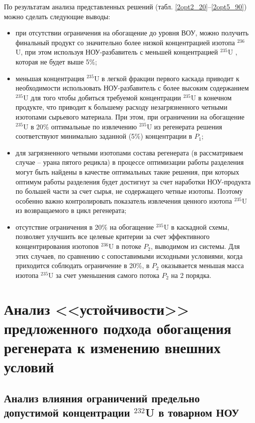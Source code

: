 По результатам анализа представленных решений (табл. \ref{2opt2_20}--\ref{2opt5_90}) можно сделать следующие выводы:
\begin{itemize}
    \item при отсутствии ограничения на обогащение до уровня ВОУ, можно получить финальный продукт со значительно более низкой концентрацией изотопа $^{236}$U, при этом используя НОУ-разбавитель с меньшей концентрацией $^{235}$U , которая не будет выше 5\%;
    \item меньшая концентрация $^{235}$U в легкой фракции первого каскада приводит к необходимости использовать НОУ-разбавитель с более высоким содержанием $^{235}$U для того чтобы добиться требуемой концентрации $^{235}$U в конечном продукте, что приводит к большему расходу незагрязненного четными изотопами сырьевого материала. При этом, при ограничении на обогащение $^{235}$U в 20\% оптимальные по извлечению $^{235}$U из регенерата решения соответствуют минимально заданной (5\%) концентрации в $P_1$;
    \item для загрязненного четными изотопами состава регенерата (в рассматриваем случае -- урана пятого рецикла) в процессе оптимизации работы разделения могут быть найдены в качестве оптимальных такие решения, при которых оптимум работы разделения будет достигнут за счет наработки НОУ-продукта по большей части за счет сырья, не содержащего четные изотопы. Поэтому особенно важно контролировать показатель извлечения ценного изотопа $^{235}$U из возвращаемого в цикл регенерата;
    \item отсутствие ограничения в 20\% на обогащение $^{235}$U в каскадной схемы, позволяет улучшить все целевые критерии за счет эффективного концентрирования изотопов $^{236}$U в потоке $P_2$, выводимом из системы. Для этих случаев, по сравнению с сопоставимыми исходными условиями, когда приходится соблюдать ограничение в 20\%, в $P_2$ оказывается меньшая масса изотопа $^{235}$U за счет уменьшения самого потока $P_2$ на 2 порядка. 
\end{itemize}


\section{Анализ <<устойчивости>> предложенного подхода обогащения регенерата к изменению внешних условий}
\subsection{Анализ влияния ограничений предельно допустимой концентрации $^{232}$U в товарном НОУ}

